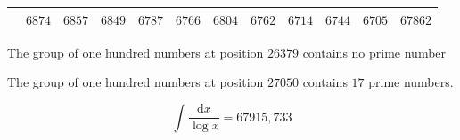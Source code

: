 \begin{minipage}{\linewidth}
\begin{tabular}{r|rrrrrrrrrr|r}
\hline
 & $6874$ & $6857$ & $6849$ & $6787$ & $6766$ & $6804$ & $6762$ & $6714$ & $6744$ & $6705$ & $67862$ \\ \hline
\end{tabular}\par\endgroup
\noindent The group of one hundred numbers at position \(26379\) contains no prime number\par
\noindent The group of one hundred numbers at position \(27050\) contains \(17\) prime numbers.\par
\setlength{\abovedisplayskip}{6pt}\setlength{\belowdisplayskip}{4pt}
\[\int\frac{\mathrm{d}x}{\log x}=67915{,}733\]
\end{minipage}\par
